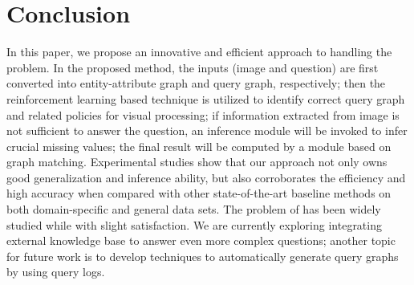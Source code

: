 \section{Conclusion}
\label{sec-conclusion}
%


In this paper, we propose an innovative and efficient approach to handling the \vqa problem. In the proposed method, the inputs (image and question) are first converted into entity-attribute graph and query graph, respectively; then the reinforcement learning based technique is utilized to identify correct query graph and related policies for visual processing; if information extracted from image is not sufficient to answer the question, an inference module will be invoked to infer crucial missing values; the final result will be computed by a module based on graph matching. Experimental studies show that our approach not only owns good generalization and inference ability, but also corroborates the efficiency and high accuracy when compared with other state-of-the-art baseline methods on both domain-specific and general \vqa data sets. The problem of \vqa has been widely studied while with slight satisfaction. We are currently exploring integrating external knowledge base to answer even more complex questions; another topic for future work is to develop techniques to automatically generate query graphs by using query logs. 


